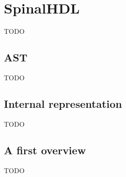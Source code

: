 \chapter{SpinalHDL} %
\label{cha:SpinalHDL}

TODO

\section{AST} %
\label{sec:AST}

TODO



\section{Internal representation} %
\label{sec:Internal representation}

TODO



\section{A first overview} %
\label{sec:A first overview}

TODO



